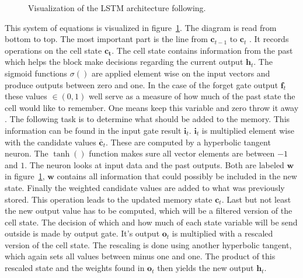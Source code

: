 \begin{figure}

\caption{Visualization of the LSTM architecture following.}
\label{fig:lstm}
\end{figure}
This system of equations is visualized in figure~\ref{fig:lstm}. The diagram is read from bottom to top. The most important part is the line from $\mathbf{c}_{t-1}$ to $\mathbf{c}_{t}$ \cite{Colah2015}. It records operations on the cell state $\mathbf{c_t}$. The cell state contains information from the past which helps the block make decisions regarding the current output $\mathbf{h}_t$. The sigmoid functions $\sigma()$ are applied element wise on the input vectors and produce outputs between zero and one. In the case of the forget gate output $\mathbf{f}_t$ these values $\in (0,1)$ well serve as a measure of how much of the past state the cell would like to remember. One means keep this variable and zero throw it away \cite{Colah2015}. 
The following task is to determine what should be added to the memory. This information can be found in the input gate result $\mathbf{i}_t$. $\mathbf{i}_t$ is multiplied element wise with the candidate values $\mathbf{\bar{c}}_t$. These are computed by a hyperbolic tangent neuron.  The $\tanh()$ function makes sure all vector elements are between $-1$ and $1$. The neuron looks at input data and the past outputs. Both are labeled $\mathbf{w}$ in figure~\ref{fig:lstm}, $\mathbf{w}$ contains all information that could possibly be included in the new state. Finally the weighted candidate values are added to what was previously stored. This operation leads to the updated memory state $\mathbf{c}_t$. 
Last but not least the new output value has to be computed, which will be a filtered version of the cell state. The decision of which and how much of each state variable will be send outside is made by output gate. It's output $\mathbf{o}_t$ is multiplied with a rescaled version of the cell state. The rescaling is done using another hyperbolic tangent, which again sets all values between minus one and one. The product of this rescaled state and the weights found in $\mathbf{o}_t$ then yields the new output $\mathbf{h}_t$. 

